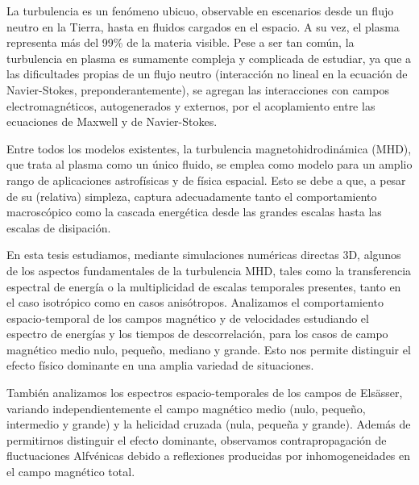 La turbulencia es un fenómeno ubicuo, observable en escenarios desde
un flujo neutro en la Tierra, hasta en fluidos cargados en el
espacio. A su vez, el plasma representa más del 99\% de la materia
visible. Pese a ser tan común, la turbulencia en plasma es sumamente
compleja y complicada de estudiar, ya que a las dificultades propias
de un flujo neutro (interacción no lineal en la ecuación de
Navier-Stokes, preponderantemente), se agregan las interacciones con
campos electromagnéticos, autogenerados y externos, por el
acoplamiento entre las ecuaciones de Maxwell y de Navier-Stokes.

Entre todos los modelos existentes, la turbulencia
magnetohidrodinámica (MHD), que trata al plasma como un único fluido,
se emplea como modelo para un amplio rango de aplicaciones
astrofísicas y de física espacial. Esto se debe a que, a pesar de su
(relativa) simpleza, captura adecuadamente tanto el comportamiento
macroscópico como la cascada energética desde las grandes escalas
hasta las escalas de disipación.

En esta tesis estudiamos, mediante simulaciones numéricas directas 3D,
algunos de los aspectos fundamentales de la turbulencia MHD, tales
como la transferencia espectral de energía o la multiplicidad de
escalas temporales presentes, tanto en el caso isotrópico como en
casos anisótropos. Analizamos el comportamiento espacio-temporal de
los campos magnético y de velocidades estudiando el espectro de
energías y los tiempos de descorrelación, para los casos de campo
magnético medio nulo, pequeño, mediano y grande. Esto nos permite
distinguir el efecto físico dominante en una amplia variedad de
situaciones.

También analizamos los espectros espacio-temporales de los campos de
Els\"asser, variando independientemente el campo magnético medio
(nulo, pequeño, intermedio y grande) y la helicidad cruzada (nula,
pequeña y grande). Además de permitirnos distinguir el efecto
dominante, observamos contrapropagación de fluctuaciones Alfvénicas
debido a reflexiones producidas por inhomogeneidades en el campo
magnético total.
